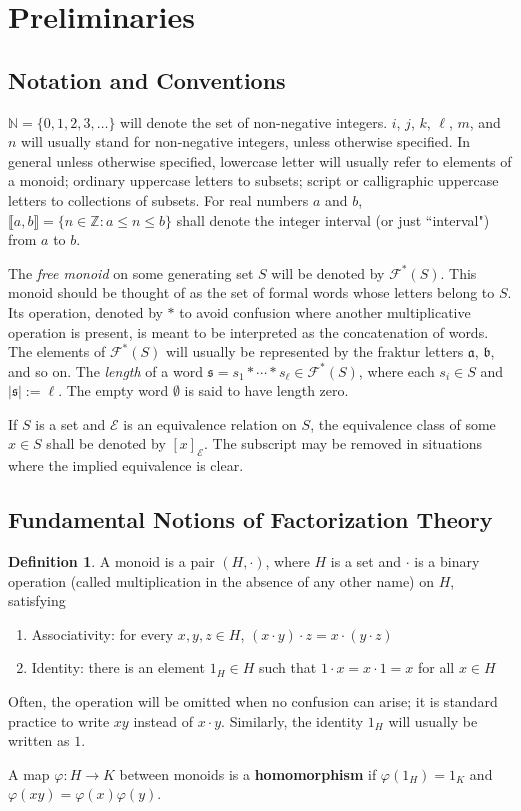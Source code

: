 \documentclass{report}
\renewcommand{\aa}{\mathfrak{a}}
\newcommand{\bb}{\mathfrak{b}}
\newcommand{\E}{\mathcal{E}}
\newcommand{\F}{\mathscr{F}}
\newcommand{\NN}{\mathbb{N}}
\newcommand{\ZZ}{\mathbb{Z}}
\newcommand{\llb}{\llbracket}
\newcommand{\rrb}{\rrbracket}
\renewcommand{\:}{\text{:}}
\theoremstyle{definition}
\newtheorem{defn}{Definition}[section]
\begin{document}
\section{Preliminaries}
\subsection{Notation and Conventions}

$\NN = \{0,1,2,3,\dots\}$ will denote the set of non-negative integers.
$i$, $j$, $k$, $\ell$, $m$, and $n$ will usually stand for non-negative integers, unless otherwise specified.
In general unless otherwise specified, lowercase letter will usually refer to elements of a monoid; ordinary uppercase letters to subsets; script or calligraphic uppercase letters to collections of subsets.
For real numbers $a$ and $b$, $\llb a,b \rrb = \{ n\in \ZZ : a \le n \le b \}$ shall denote the integer interval (or just ``interval") from $a$ to $b$.

The \textit{free monoid} on some generating set $S$ will be denoted by $\F^*(S)$.  
This monoid should be thought of as the set of formal words whose letters belong to $S$.
Its operation, denoted by $*$ to avoid confusion where another multiplicative operation is present, is meant to be interpreted as the concatenation of words.
The elements of $\F^*(S)$ will usually be represented by the fraktur letters $\aa$, $\bb$, and so on.  
The \textit{length} of a word $\mathfrak{s}= s_1 * \cdots * s_\ell  \in \F^*(S)$, where each $s_i\in S$ and $| \mathfrak{s} | := \ell$.
The empty word $\emptyset$ is said to have length zero.

If $S$ is a set and $\E$ is an equivalence relation on $S$, the equivalence class of some $x\in S$ shall be denoted by $[x]_\E$.
The subscript may be removed in situations where the implied equivalence is clear.

\subsection{Fundamental Notions of Factorization Theory}
\begin{defn}
A monoid is a pair $(H,\cdot)$, where $H$ is a set and $\cdot $ is a binary operation (called multiplication in the absence of any other name) on $H$, satisfying
\begin{enumerate}
\item Associativity: for every $x,y,z \in H$, $(x\cdot y)\cdot z = x\cdot (y\cdot z)$
\item Identity: there is an element $1_H\in H$ such that $1\cdot x = x\cdot 1 = x$ for all $x\in H$
\end{enumerate}
Often, the operation will be omitted when no confusion can arise; it is standard practice to write $xy$ instead of $x \cdot y$.
Similarly, the identity $1_H$ will usually be written as $1$.

A map $\varphi: H \to K$ between monoids is a \textbf{homomorphism} if $\varphi(1_H) = 1_K$ and $\varphi(xy) = \varphi(x)\varphi(y)$.
\end{defn}
\end{document}
